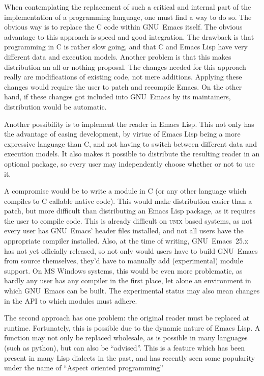 \documentclass[a4paper,10pt,twoside]{report}
\newcommand{\el}{Emacs Lisp}
\newcommand{\emacs}{GNU~Emacs}
\newcommand{\emacsv}[1]{GNU~Emacs~#1}
\newcommand{\unix}{\textsc{unix}}
\begin{document}
When contemplating the replacement of such a critical and internal part of the
implementation of a programming language, one must find a way to do so.  The
obvious way is to replace the C code within \emacs{} itself.  The obvious
advantage to this approach is speed and good integration.  The drawback is that
programming in C is rather slow going, and that C and \el{} have very different
data and execution models.  Another problem is that this makes distribution an
all or nothing proposal.  The changes needed for this approach really are
modifications of existing code, not mere additions.  Applying these changes
would require the user to patch and recompile Emacs.  On the other hand, if
these changes got included into \emacs{} by its maintainers, distribution would
be automatic.

Another possibility is to implement the reader in \el.  This not only has the
advantage of easing development, by virtue of \el{} being a more expressive
language than C, and not having to switch between different data and execution
models.  It also makes it possible to distribute the resulting reader in an
optional package, so every user may independently choose whether or not to use
it.

A compromise would be to write a module in C (or any other language which
compiles to C callable native code).  This would make distribution easier than a
patch, but more difficult than distributing an \el{} package, as it requires the
user to compile code. This is already difficult on \unix{} based systems, as not
every user has \emacs{}’ header files installed, and not all users have the
appropriate compiler installed.  Also, at the time of writing, \emacsv{25.x} has
not yet officially released, so not only would users have to build \emacs{} from
source themselves, they’d have to manually add (experimental) module support.
On MS Windows systems, this would be even more problematic, as hardly any user
has any compiler in the first place, let alone an environment in which \emacs{}
can be built.  The experimental status may also mean changes in the API to which
modules must adhere.

The second approach has one problem: the original reader must be replaced at
runtime.  Fortunately, this is possible due to the dynamic nature of \el.  A
function may not only be replaced wholesale, as is possible in many languages
(such as python), but can also be ``advised''.  This is a feature which has been
present in many Lisp dialects in the past, and has recently seen some popularity
under the name of ``Aspect oriented programming''
\end{document}
